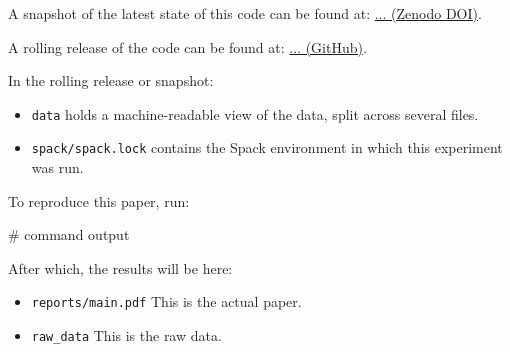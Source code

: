 \documentclass[conference]{IEEEtran}
\begin{document}

A snapshot of the latest state of this code can be found at: \url{... (Zenodo DOI)}.

A rolling release of the code can be found at: \url{... (GitHub)}.

In the rolling release or snapshot:
\begin{itemize}
\item \texttt{data} holds a machine-readable view of the data, split across several files.
\item \texttt{spack/spack.lock} contains the Spack environment in which this experiment was run.
\end{itemize}

To reproduce this paper, run:

\begin{verbatim*}
# command
output
\end{verbatim*}

After which, the results will be here:

\begin{itemize}
\item \texttt{reports/main.pdf} This is the actual paper.
\item \texttt{raw\_data} This is the raw data.
\end{itemize}
\end{document}
